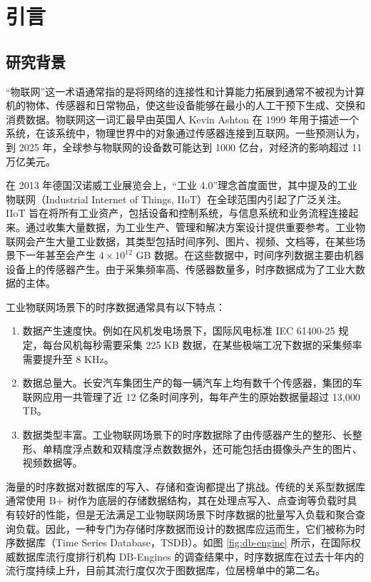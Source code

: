 
\chapter{引言}
\section{研究背景\label{sec:chap1-sec1}}
“物联网”这一术语通常指的是将网络的连接性和计算能力拓展到通常不被视为计算机的物体、传感器和日常物品，使这些设备能够在最小的人工干预下生成、交换和消费数据。物联网这一词汇最早由英国人 Kevin Ashton 在 1999 年用于描述一个系统，在该系统中，物理世界中的对象通过传感器连接到互联网\cite{li2015internet}。一些预测认为，到 2025 年，全球参与物联网的设备数可能达到 1000 亿台，对经济的影响超过 11 万亿美元\cite{rose2015internet}。

在 2013 年德国汉诺威工业展览会上，“工业 4.0”理念首度面世\cite{ghobakhloo2020industry}，其中提及的工业物联网（Industrial Internet of Things, IIoT）在全球范围内引起了广泛关注。IIoT 旨在将所有工业资产，包括设备和控制系统，与信息系统和业务流程连接起来。通过收集大量数据，为工业生产、管理和解决方案设计提供重要参考\cite{sisinni2018industrial}。工业物联网会产生大量工业数据，其类型包括时间序列、图片、视频、文档等，在某些场景下一年甚至会产生 $4\times 10^{12}$ GB 数据\cite{ge2012riseofindustrial}。在这些数据中，时间序列数据主要由机器设备上的传感器产生。由于采集频率高、传感器数量多，时序数据成为了工业大数据的主体\cite{di2019industrial}。

工业物联网场景下的时序数据通常具有以下特点：
\begin{enumerate}
  \item 数据产生速度快。例如在风机发电场景下，国际风电标准 IEC 61400-25 规定，每台风机每秒需要采集 225 KB 数据，在某些极端工况下数据的采集频率需要提升至 8 KHz\cite{李天安2020apache}。
  \item 数据总量大。长安汽车集团生产的每一辆汽车上均有数千个传感器，集团的车联网应用一共管理了近 12 亿条时间序列，每年产生的原始数据量超过 13,000 TB。
  \item 数据类型丰富。工业物联网场景下的时序数据除了由传感器产生的整形、长整形、单精度浮点数和双精度浮点数数据外，还可能包括由摄像头产生的图片、视频数据等。
\end{enumerate}

海量的时序数据对数据库的写入、存储和查询都提出了挑战。传统的关系型数据库通常使用 B+ 树作为底层的存储数据结构，其在处理点写入、点查询等负载时具有较好的性能，但是无法满足工业物联网场景下时序数据的批量写入负载和聚合查询负载\cite{jensen2017time}。因此，一种专门为存储时序数据而设计的数据库应运而生，它们被称为时序数据库（Time Series Database，TSDB）。如图 \ref{fig:db-engine} 所示，在国际权威数据库流行度排行机构 DB-Engines 的调查结果中，时序数据库在过去十年内的流行度持续上升，目前其流行度仅次于图数据库，位居榜单中的第二名。

